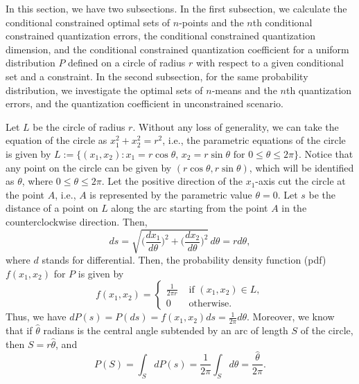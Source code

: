 \documentclass[12pt, reqno]{amsart}
\theoremstyle{plain}
\theoremstyle{definition}
\newcommand{\set}[1]{\{#1\}}%
\newcommand{\gq}{\theta}
\newcommand{\te}{\text}%
\begin{document}
In this section, we have two subsections. In the first subsection,  we calculate the conditional constrained optimal sets of $n$-points and the $n$th conditional constrained quantization errors, the conditional constrained quantization dimension, and the conditional constrained quantization coefficient for a uniform distribution $P$ defined on a circle of radius $r$ with respect to a given conditional set and a constraint. In the second subsection, for the same probability distribution, we investigate the optimal sets of $n$-means and the $n$th quantization errors, and the quantization coefficient in unconstrained scenario.  
\par
Let $L$ be the circle of radius $r$. Without any loss of generality, we can take the equation of the circle as $x_1^2+x_2^2=r^2$, i.e., the parametric equations of the circle is given by
$L:=\set{(x_1, x_2) :  x_1=r\cos \gq, \, x_2=r\sin\gq \te{ for } 0\leq \gq\leq 2\pi}.$ Notice that any point on the circle can be given by $(r\cos\gq, r\sin \gq)$, which will be identified as $\gq$, where $0\leq \gq\leq 2\pi$. 
Let the positive direction of the $x_1$-axis cut the circle at the point $A$, i.e., $A$ is represented by the parametric value $\gq=0$. Let $s$ be the distance of a point on $L$ along the arc starting from the point $A$ in the counterclockwise direction. Then,
\[ds=\sqrt{\Big(\frac {dx_1}{d\gq}\Big)^2+\Big(\frac{dx_2}{d\gq}\Big)^2}\,d\gq=rd\gq,\]
where $d$ stands for differential. 
 Then, the  probability density function (pdf) $f(x_1, x_2)$ for $P$ is given by
\[f(x_1, x_2)=\left\{\begin{array}{ccc}
\frac 1 {2\pi r} & \te{ if } (x_1, x_2) \in L,\\
 0  & \te{ otherwise}.
\end{array}\right.
\]
Thus, we have $dP(s)=P(ds)=f(x_1, x_2) ds=\frac 1{2\pi } d\gq$.
Moreover, we know that if $\hat \gq$ radians is the
central angle subtended by an arc of length $S$ of the circle, then $S =r \hat \gq$, and
\[P(S)=\int_S dP(s)=\frac 1{2 \pi} \int_S d\gq= \frac{\hat\gq} {2\pi}.\]
\end{document}
